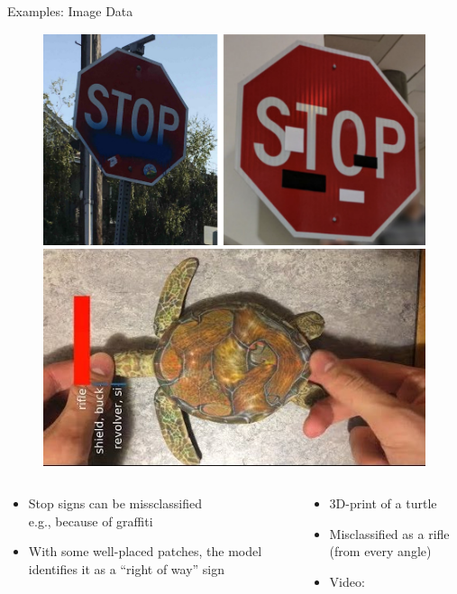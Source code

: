 \documentclass[11pt,compress,t,notes=noshow, aspectratio=169, xcolor=table]{beamer}
\begin{document}
\begin{vbframe}[c]{Examples: Image Data   }
\begin{figure}[h]
\centering
\includegraphics[width=0.46\linewidth]{figure/AEstop.png}\quad \includegraphics[width=0.45\linewidth]{figure/AEturtle.jpg}
  \label{fig:mnist}
\end{figure} 

\begin{columns}

\begin{column}{0.5\textwidth}

\begin{itemize}
    \item Stop signs can be missclassified\\ e.g., because of graffiti
    \item With some well-placed patches, the model identifies it as a ``right of way'' sign
\end{itemize}

\end{column}

\begin{column}{0.5\textwidth}

\begin{itemize}
    \item 3D-print of a turtle
    \item Misclassified as a rifle (from every angle)
    \item Video: 
\end{itemize}

\end{column}

\end{columns}


\end{vbframe}
\end{document}
